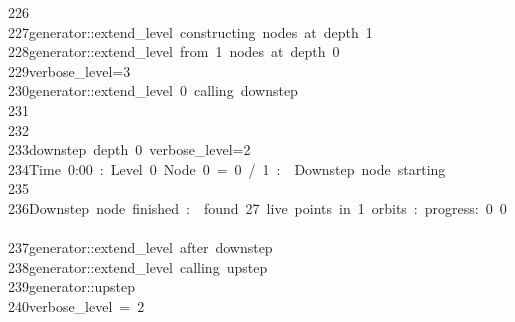 \begin{tabbing}
226\>\\[0pt]
227\>generator::extend\_level\ constructing\ nodes\ at\ depth\ 1\\[0pt]
228\>generator::extend\_level\ from\ 1\ nodes\ at\ depth\ 0\\[0pt]
229\>verbose\_level=3\\[0pt]
230\>generator::extend\_level\ 0\ calling\ downstep\\[0pt]
231\>\\[0pt]
232\>\\[0pt]
233\>downstep\ depth\ 0\ verbose\_level=2\\[0pt]
234\>Time\ 0:00\ :\ Level\ 0\ Node\ 0\ =\ 0\ /\ 1\ :\ \ Downstep\ node\ starting\\[0pt]
235\>\\[0pt]
236\>Downstep\ node\ finished\ :\ \ found\ 27\ live\ points\ in\ 1\ orbits\ :\ progress:\ 0\ 0\ \ \\[0pt]
237\>generator::extend\_level\ after\ downstep\\[0pt]
238\>generator::extend\_level\ calling\ upstep\\[0pt]
239\>generator::upstep\\[0pt]
240\>verbose\_level\ =\ 2\\[0pt]

\end{tabbing}
